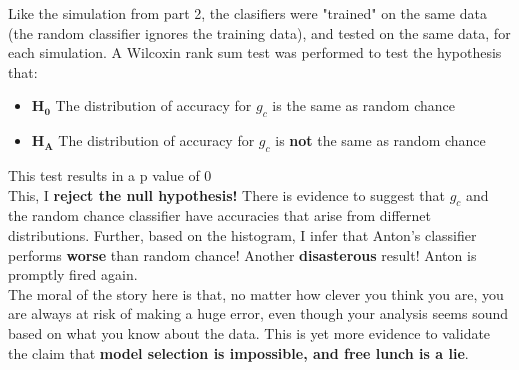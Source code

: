 \documentclass{article}
\begin{document}
      Like the simulation from part 2, the clasifiers were "trained" on the same data (the random classifier ignores the training data), and tested on the same data, for each simulation. A Wilcoxin rank sum test was performed to test the hypothesis that:
      \begin{itemize}
        \item[] $\mathbf{H_0}$ The distribution of accuracy for $g_c$ is the same as random chance
        \item[] $\mathbf{H_A}$ The distribution of accuracy for $g_c$ is \textbf{not} the same as random chance
      \end{itemize}
      This test results in a p value of $0$\\[6pt]
      This, I \textbf{reject the null hypothesis!} There is evidence to suggest that $g_c$ and the random chance classifier have accuracies that arise from differnet distributions. Further, based on the histogram, I infer that Anton's classifier performs \textbf{worse} than random chance! Another \textbf{disasterous} result! Anton is promptly fired again.\\[12pt]

  The moral of the story here is that, no matter how clever you think you are, you are always at risk of making a huge error, even though your analysis seems sound based on what you know about the data. This is yet more evidence to validate the claim that \textbf{model selection is impossible, and free lunch is a lie}.
\end{document}
